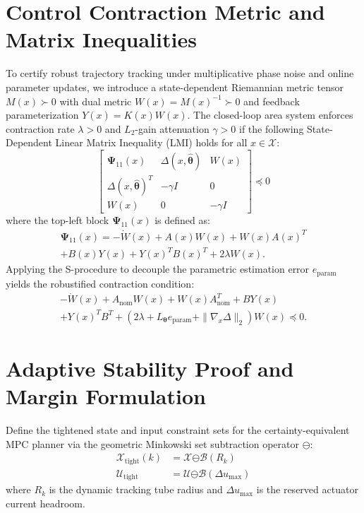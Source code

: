 \documentclass[journal]{IEEEtran}
\begin{document}
\section{Control Contraction Metric and Matrix Inequalities}
To certify robust trajectory tracking under multiplicative phase noise and online parameter updates, we introduce a state-dependent Riemannian metric tensor $M(x) \succ 0$ with dual metric $W(x) = M(x)^{-1} \succ 0$ and feedback parameterization $Y(x) = K(x)W(x)$. The closed-loop area system enforces contraction rate $\lambda > 0$ and $L_2$-gain attenuation $\gamma > 0$ if the following State-Dependent Linear Matrix Inequality (LMI) holds for all $x \in \mathcal{X}$:
\begin{equation}
    \begin{bmatrix}
        \bm{\Psi}_{11}(x) & \Delta(x, \hat{\bm{\theta}}) & W(x) \\
        \Delta(x, \hat{\bm{\theta}})^T & -\gamma I & 0 \\
        W(x) & 0 & -\gamma I
    \end{bmatrix} \preceq 0
\end{equation}
where the top-left block $\bm{\Psi}_{11}(x)$ is defined as:
\begin{multline}
    \bm{\Psi}_{11}(x) = -\dot{W}(x) + A(x)W(x) + W(x)A(x)^T \\
    + B(x)Y(x) + Y(x)^T B(x)^T + 2\lambda W(x).
\end{multline}
Applying the S-procedure to decouple the parametric estimation error $e_{\text{param}}$ yields the robustified contraction condition:
\begin{multline}
    -\dot{W}(x) + A_{\text{nom}}W(x) + W(x)A_{\text{nom}}^T + B Y(x) \\
    + Y(x)^T B^T + \left(2\lambda + L_{\bm{\theta}} e_{\text{param}} + \|\nabla_x \Delta\|_2 \right) W(x) \preceq 0.
\end{multline}

\section{Adaptive Stability Proof and Margin Formulation}
Define the tightened state and input constraint sets for the certainty-equivalent MPC planner \cite{kohler26, sasfi23} via the geometric Minkowski set subtraction operator $\bm{\ominus}$:
\begin{align}
    \mathcal{X}_{\text{tight}}(k) &= \mathcal{X} \bm{\ominus} \mathcal{B}(R_k) \\
    \mathcal{U}_{\text{tight}} &= \mathcal{U} \bm{\ominus} \mathcal{B}(\Delta u_{\max})
\end{align}
where $R_k$ is the dynamic tracking tube radius and $\Delta u_{\max}$ is the reserved actuator current headroom.
\end{document}
